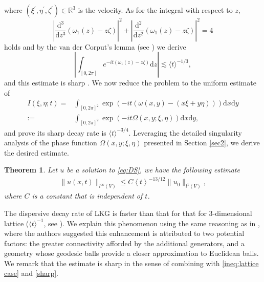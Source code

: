 \documentclass[12pt]{amsart}
\newtheorem{theorem}{Theorem}[section]
\newcommand\JP[1]{\langle#1\rangle}
\newcommand{\R}{\mathbb{R}}
\def\d{\mathrm{d}}
\begin{document}
where $\left(\xi^{\prime},\eta^{\prime},\zeta^{\prime}\right)\in\R^{3}$ is the velocity. 
As for the integral with respect to $z$, 
\begin{equation*}
	\left|\frac{\d^{3}}{\d z^{3}}\left(\omega_{1}\left(z\right)-z\zeta\right)\right|^{2}+\left|\frac{\d^{2}}{\d z^{2}}\left(\omega_{1}\left(z\right)-z\zeta\right)\right|^{2}=4
\end{equation*}
holds and by the van der Corput's lemma (see \cite[Chapter VIII]{SM93}) we derive
\begin{equation}\label{ineq:lattice case}
	\left|\int_{\left[0,2\pi\right]}e^{-it\left(\omega_{1}\left(z\right)-z\zeta\right)}\d z\right|\lesssim \JP{t}^{-1/3},
\end{equation}
and this estimate is sharp {\cite{SK05}}. We now reduce the problem to the uniform estimate of 
\begin{equation}\label{eq:main oscillatory integral}
	\begin{aligned}
		I\left(\xi,\eta;t\right)=&\int_{\left[0,2\pi\right]^{2}}\exp\left(-it\left(\omega\left(x,y\right)-\left(x\xi+y\eta\right)\right)\right)\d x\d y\\
		:=&\int_{\left[0,2\pi\right]^{2}}\exp\left(-it\Omega\left(x,y;\xi,\eta\right)\right)\d x\d y,
	\end{aligned}
\end{equation}
 and prove its sharp decay rate is $\JP{t}^{-3/4}$. Leveraging the detailed singularity analysis of the phase function $\Omega\left(x,y;\xi,\eta\right)$ presented in Section \ref{sec2}, we derive the desired estimate.

\begin{theorem}\label{thm:main}
    Let $u$ be a solution to \eqref{eq:DS}, we have the following estimate \begin{align}
        \|u(x,t)\|_{l^\infty(V)}\le C\left\langle t\right\rangle^{-13/12}\|u_0\|_{l^1(V)},
	\end{align}
 where $C$ is a constant
that is independent of $t$.
\end{theorem}

    The dispersive decay rate of LKG is faster than that for that for $3$-dimensional lattice (\( \langle t \rangle^{-1} \), see \cite{SK05}). We explain this phenomenon using the same reasoning as in \cite{GHJZ25}, where the authors suggested this enhancement is attributed to two potential factors: the greater connectivity afforded by the additional generators, and a geometry whose geodesic balls provide a closer approximation to Euclidean balls. We remark that the estimate is sharp in the sense of combining with \eqref{ineq:lattice case} and \eqref{sharp}.
\end{document}
